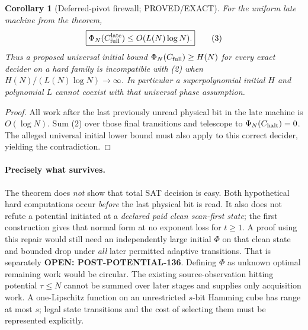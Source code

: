 \documentclass[11pt]{article}
\newtheorem{corollary}[theorem]{Corollary}
\begin{document}
\begin{corollary}[Deferred-pivot firewall; PROVED/EXACT]
For the uniform late machine from the theorem,
\[
\boxed{\Phi_N(C_{\rm full}^{\rm late})
  \le O(L(N)\log N).} \tag{3}
\]
Thus a proposed universal initial bound
$\Phi_N(C_{\rm full})\ge H(N)$ \emph{for every exact
decider on a hard family} is incompatible with (2)
when $H(N)/(L(N)\log N)\to\infty$. In particular
a superpolynomial initial $H$ and polynomial $L$
cannot coexist with that universal phase assumption.
\end{corollary}
\begin{proof}
All work after the last previously unread physical
bit in the late machine is $O(\log N)$. Sum (2)
over those final transitions and telescope to
$\Phi_N(C_{\rm halt})=0$. The alleged universal initial
lower bound must also apply to this correct
decider, yielding the contradiction.
\end{proof}

\paragraph{Precisely what survives.}
The theorem does \emph{not} show that total SAT decision
is easy. Both hypothetical hard computations occur
\emph{before} the last physical bit is read.
It also does not refute a potential initiated at
a \emph{declared paid clean scan-first state};
the first construction gives that normal form
at no exponent loss for $t\ge1$.
A proof using this repair would still need an
independently large initial $\Phi$ on that clean
state and bounded drop under \emph{all} later
permitted adaptive transitions. That is separately
\textbf{OPEN: POST-POTENTIAL-136}.
Defining $\Phi$ as unknown optimal remaining work
would be circular. The existing source-observation
hitting potential $\tau\le N$ cannot be summed
over later stages and supplies only acquisition work.
A one-Lipschitz function on an unrestricted
$s$-bit Hamming cube has range at most $s$;
legal state transitions and the cost of selecting them
must be represented explicitly.
\end{document}
